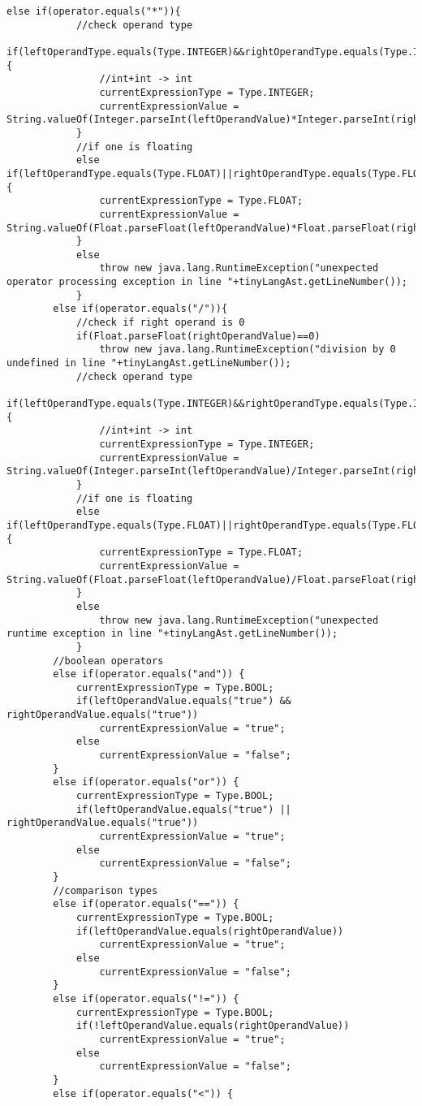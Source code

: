 \begin{lstlisting}[basicstyle=\miniscule,caption=Interpreter,label=listing:interpreter]
		else if(operator.equals("*")){
			//check operand type
			if(leftOperandType.equals(Type.INTEGER)&&rightOperandType.equals(Type.INTEGER)) {
				//int+int -> int
				currentExpressionType = Type.INTEGER;
				currentExpressionValue = String.valueOf(Integer.parseInt(leftOperandValue)*Integer.parseInt(rightOperandValue));
			}
			//if one is floating 
			else if(leftOperandType.equals(Type.FLOAT)||rightOperandType.equals(Type.FLOAT)) {
				currentExpressionType = Type.FLOAT;
				currentExpressionValue = String.valueOf(Float.parseFloat(leftOperandValue)*Float.parseFloat(rightOperandValue));
			}
			else
				throw new java.lang.RuntimeException("unexpected operator processing exception in line "+tinyLangAst.getLineNumber());
			}
		else if(operator.equals("/")){
			//check if right operand is 0 
			if(Float.parseFloat(rightOperandValue)==0)
				throw new java.lang.RuntimeException("division by 0 undefined in line "+tinyLangAst.getLineNumber());
			//check operand type
			if(leftOperandType.equals(Type.INTEGER)&&rightOperandType.equals(Type.INTEGER)) {
				//int+int -> int
				currentExpressionType = Type.INTEGER;
				currentExpressionValue = String.valueOf(Integer.parseInt(leftOperandValue)/Integer.parseInt(rightOperandValue));
			}
			//if one is floating 
			else if(leftOperandType.equals(Type.FLOAT)||rightOperandType.equals(Type.FLOAT)) {
				currentExpressionType = Type.FLOAT;
				currentExpressionValue = String.valueOf(Float.parseFloat(leftOperandValue)/Float.parseFloat(rightOperandValue));
			}
			else
				throw new java.lang.RuntimeException("unexpected runtime exception in line "+tinyLangAst.getLineNumber());
			}
		//boolean operators
		else if(operator.equals("and")) {
			currentExpressionType = Type.BOOL;
			if(leftOperandValue.equals("true") && rightOperandValue.equals("true"))
				currentExpressionValue = "true";
			else 
				currentExpressionValue = "false";
		}
		else if(operator.equals("or")) {
			currentExpressionType = Type.BOOL;
			if(leftOperandValue.equals("true") || rightOperandValue.equals("true"))
				currentExpressionValue = "true";
			else 
				currentExpressionValue = "false";
		}
		//comparison types
		else if(operator.equals("==")) {
			currentExpressionType = Type.BOOL;
			if(leftOperandValue.equals(rightOperandValue))
				currentExpressionValue = "true";
			else 
				currentExpressionValue = "false";
		}
		else if(operator.equals("!=")) {
			currentExpressionType = Type.BOOL;
			if(!leftOperandValue.equals(rightOperandValue))
				currentExpressionValue = "true";
			else 
				currentExpressionValue = "false";
		}
		else if(operator.equals("<")) {

\end{lstlisting}
